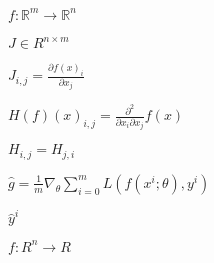 \documentclass{article}
\begin{document}
	
	$\mathit{f} : \mathbb{R}^{m} \to \mathbb{R}^{n}$
	
	$\mathit{J} \in R^{n \times m}$
	
	
	$\mathit{J}_{i,j} = \frac{\partial f(x)_{i}}{\partial x_{j}}$
	
	$H(f)(x)_{i,j} = \frac{\partial^2}{\partial{x_{i}} \partial{x_{j}}}f(x)$
	
	$H_{i,j} = H_{j,i}$
	
	$\hat{g} = \frac{1}{m}\nabla_{\theta}{\sum_{i = 0}^{m}{L(f(x^{i};\theta), y^{i})}}$
	
	$\hat{y}^{i}$

	${f} : R^{n} \to R$
\end{document}
